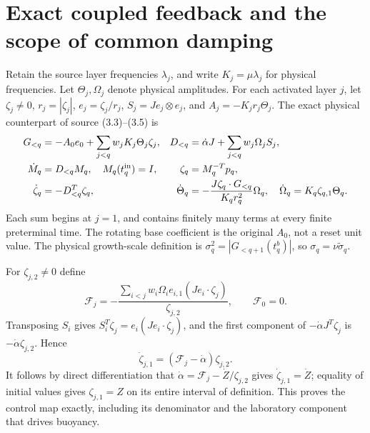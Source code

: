 \section{Exact coupled feedback and the scope of common damping}
\label{sec:feedback}
Retain the source layer frequencies $\lambda_j$, and write
$K_j=\mu\lambda_j$ for physical frequencies. Let $\Theta_j,
\Omega_j$ denote physical amplitudes. For each activated layer
$j$, let $\zeta_j\ne0$, $r_j=|\zeta_j|$, $e_j=\zeta_j/r_j$,
$S_j=Je_j\otimes e_j$, and $A_j=-K_jr_j\Theta_j$.
The exact physical counterpart of source (3.3)--(3.5) is
\begin{align}
 G_{<q}&=-A_0e_0+\sum_{j<q}w_jK_j\Theta_j\zeta_j,
 &D_{<q}&=\dot\alpha J+\sum_{j<q}w_j\Omega_jS_j,\notag\\
 \dot M_q&=D_{<q}M_q,\quad M_q(t_q^{\rm in})=I,
 &\zeta_q&=M_q^{-T}p_q,\notag\\
 \dot\zeta_q&=-D_{<q}^T\zeta_q,
 &\dot\Theta_q&=-\frac{J\zeta_q\cdot G_{<q}}{K_qr_q^2}\Omega_q,
 \quad\dot\Omega_q=K_q\zeta_{q,1}\Theta_q.
 \label{eq:physicalcoupled}
\end{align}
Each sum begins at $j=1$, and contains finitely many terms at
every finite preterminal time. The rotating base coefficient
is the original $A_0$, not a reset unit value. The physical
growth-scale definition is $\sigma_q^2=|G_{<q+1}(t_q^b)|$,
so $\sigma_q=\nu\widetilde\sigma_q$.

For $\zeta_{j,2}\ne0$ define
\begin{equation}
 \mathcal F_j=-\frac{\sum_{i<j}w_i\Omega_i e_{i,1}
 (Je_i\cdot\zeta_j)}{\zeta_{j,2}},\qquad \mathcal F_0=0.
 \label{eq:physicalfeedback}
\end{equation}
Transposing $S_i$ gives
$S_i^T\zeta_j=e_i(Je_i\cdot\zeta_j)$, and the first
component of $-\dot\alpha J^T\zeta_j$ is
$-\dot\alpha\zeta_{j,2}$. Hence
\begin{equation}
 \dot\zeta_{j,1}=(\mathcal F_j-\dot\alpha)\zeta_{j,2}.
 \label{eq:controlledcomponent}
\end{equation}
It follows by direct differentiation that
$\dot\alpha=\mathcal F_j-\dot Z/\zeta_{j,2}$ gives
$\dot\zeta_{j,1}=\dot Z$; equality of initial values gives
$\zeta_{j,1}=Z$ on its entire interval of definition.
This proves the control map exactly, including its denominator
and the laboratory component that drives buoyancy.

